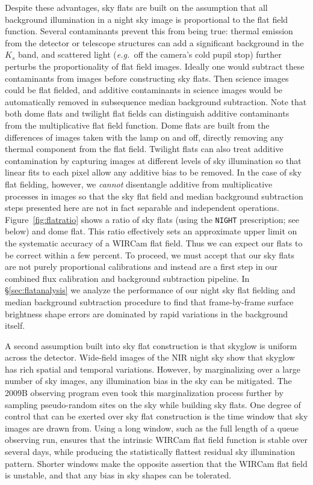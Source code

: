 \documentclass[iop,tighten]{emulateapj}
\newcommand{\eg}{\textit{e.g.~}}
\newcommand{\Sec}[1]{\S\ref{sec:#1}}  %
\begin{document}
Despite these advantages, sky flats are built on the assumption that all background illumination in a night sky image is proportional to the flat field function.
Several contaminants prevent this from being true: thermal emission from the detector or telescope structures can add a significant background in the $K_s$ band, and scattered light (\eg off the camera's cold pupil stop) further perturbs the proportionality of flat field images.
Ideally one would subtract these contaminants from images before constructing sky flats.
Then science images could be flat fielded, and additive contaminants in science images would be automatically removed in subsequence median background subtraction.
Note that both dome flats and twilight flat fields can distinguish additive contaminants from the multiplicative flat field function.
Dome flats are built from the differences of images taken with the lamp on and off, directly removing any thermal component from the flat field.
Twilight flats can also treat additive contamination by capturing images at different levels of sky illumination so that linear fits to each pixel allow any additive bias to be removed.
In the case of sky flat fielding, however, we \emph{cannot} disentangle additive from multiplicative processes in images so that the sky flat field and median background subtraction steps presented here are not in fact separable and independent operations.
Figure~\ref{fig:flatratio} shows a ratio of sky flats (using the \texttt{NIGHT} prescription; see below) and dome flat.
This ratio effectively sets an approximate upper limit on the systematic accuracy of a WIRCam flat field. 
Thus we can expect our flats to be correct within a few percent.
To proceed, we must accept that our sky flats are not purely proportional calibrations and instead are a first step in our combined flux calibration and background subtraction pipeline.
In \Sec{flatanalysis} we analyze the performance of our night sky flat fielding and median background subtraction procedure to find that frame-by-frame surface brightness shape errors are dominated by rapid variations in the background itself.

A second assumption built into sky flat construction is that skyglow is uniform across the detector.
Wide-field images of the NIR night sky show that skyglow has rich spatial and temporal variations.
However, by marginalizing over a large number of sky images, any illumination bias in the sky can be mitigated.
The 2009B observing program even took this marginalization process further by sampling pseudo-random sites on the sky while building sky flats. One degree of control that can be exerted over sky flat construction is the time window that sky images are drawn from.
Using a long window, such as the full length of a queue observing run, ensures that the intrinsic WIRCam flat field function is stable over several days, while producing the statistically flattest residual sky illumination pattern.
Shorter windows make the opposite assertion that the WIRCam flat field is unstable, and that any bias in sky shapes can be tolerated.
\end{document}
